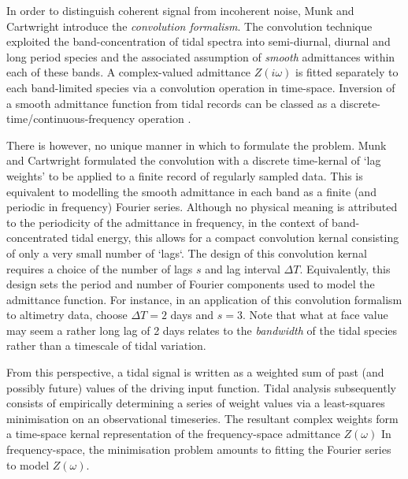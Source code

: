 In order to distinguish coherent signal from incoherent noise, Munk and Cartwright introduce the \emph{convolution formalism}. The convolution technique exploited the band-concentration of tidal spectra into semi-diurnal, diurnal and long period species and the associated assumption of \emph{smooth} admittances within each of these bands.  A complex-valued admittance $Z(i\omega)$ is fitted separately to each band-limited species via a convolution operation in time-space. 
Inversion of a smooth admittance function from tidal records can be classed as a discrete-time/continuous-frequency operation \citep{Percival:1998tw}.

There is however, no unique manner in which to formulate the problem.  Munk and Cartwright formulated the convolution with a discrete time-kernal of `lag weights' to be applied to a finite record of regularly sampled data. %
This is equivalent to modelling the smooth admittance in each band as a finite (and periodic in frequency) Fourier series.   Although no physical meaning is attributed to the periodicity of the admittance in frequency, in the context of band-concentrated tidal energy, this allows for a compact convolution kernal consisting of only a very small number of `lags`.   The design of this convolution kernal requires a choice of the number of lags $s$ and lag interval $\Delta T$.  Equivalently, this design sets the period and number of Fourier components used to model the admittance function.  For instance, in an application of this convolution formalism to altimetry data, \citet{Smith:1997ut} choose $\Delta T=2$ days and $s=3$.   Note that what at face value may seem a rather long lag of 2 days relates to the \emph{bandwidth} of the tidal species rather than a timescale of tidal variation.

From this perspective, a tidal signal is written as a weighted sum of past (and possibly future) values of the driving input function. 
Tidal analysis subsequently consists of empirically determining a series of weight values  via a least-squares minimisation on an observational timeseries.
The resultant complex weights form a time-space kernal representation of the frequency-space admittance $Z(\omega)$   In frequency-space, the minimisation problem amounts to fitting the Fourier series to model $Z(\omega)$.

